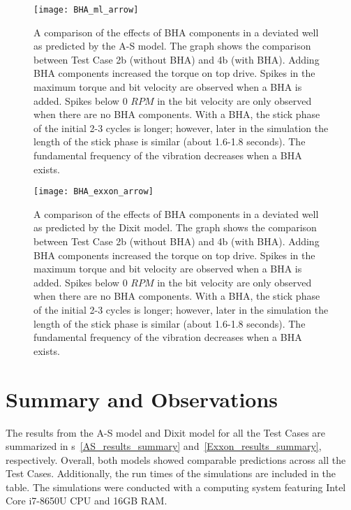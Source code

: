 \begin{figure}
	\centering
	\texttt{[image: BHA\_ml\_arrow]}
    \caption[Effects of BHA components in a deviated well from the A-S model]{A comparison of the effects of BHA components in a deviated well as predicted by the A-S model. The graph shows the comparison between Test Case 2b (without BHA) and 4b (with BHA). Adding BHA components increased the torque on top drive. Spikes in the maximum torque and bit velocity are observed when a BHA is added. Spikes below 0 $RPM$ in the bit velocity are only observed when there are no BHA components. With a BHA, the stick phase of the initial 2-3 cycles is longer; however, later in the simulation the length of the stick phase is similar (about 1.6-1.8 seconds). The fundamental frequency of the vibration decreases when a BHA exists.}
	\label{figure_BHA_Matlab}
\end{figure}

\begin{figure}
	\centering
	\texttt{[image: BHA\_exxon\_arrow]}
    \caption[Effects of BHA components in a deviated well from the Dixit model]{A comparison of the effects of BHA components in a deviated well as predicted by the Dixit model. The graph shows the comparison between Test Case 2b (without BHA) and 4b (with BHA). Adding BHA components increased the torque on top drive. Spikes in the maximum torque and bit velocity are observed when a BHA is added. Spikes below 0 $RPM$ in the bit velocity are only observed when there are no BHA components. With a BHA, the stick phase of the initial 2-3 cycles is longer; however, later in the simulation the length of the stick phase is similar (about 1.6-1.8 seconds). The fundamental frequency of the vibration decreases when a BHA exists.}
	\label{figure_BHA_EXXON}
\end{figure}

\section{Summary and Observations}
The results from the A-S model and Dixit model for all the Test Cases are summarized in \tablename{}s~\ref{AS_results_summary} and~\ref{Exxon_results_summary}, respectively. Overall, both models showed comparable predictions across all the Test Cases. Additionally, the run times of the simulations are included in the table.  The simulations were conducted with a computing system featuring Intel\textsuperscript{\textregistered} Core\textsuperscript{\texttrademark} i7-8650U CPU and 16GB RAM\@.

